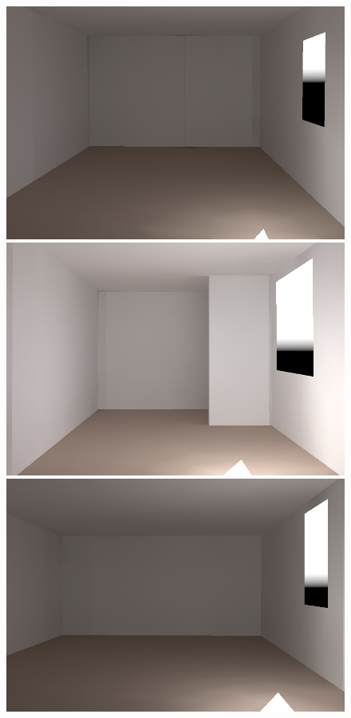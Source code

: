 \begin{figure}[t]
\includegraphics[width=\figwidth]{p2r_042_camera_dark_march_crop.png} \hfill %
\includegraphics[width=\figwidth]{p2r_031_camera_dark_march_crop.png} \hfill %
\includegraphics[width=\figwidth]{p2r_014_camera_dark_march_crop.png} \\ %


\end{figure}
